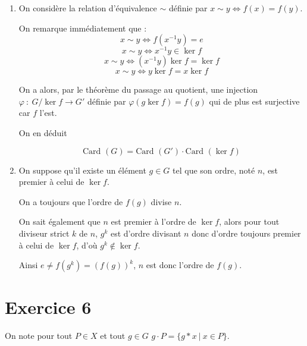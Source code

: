 \documentclass[]{article}
\theoremstyle{remark}
\theoremstyle{definition}
\newcommand{\funcshort}[3]{
#1 ~ : ~ #2 \longrightarrow #3
}
\begin{document}
\begin{enumerate}
	\item On considère la relation d'équivalence $\sim$ définie par $x \sim y \Longleftrightarrow f(x) = f(y)$.
	
	On remarque immédiatement que :
	$$x \sim y \Longleftrightarrow f(x^{-1}y) = e$$
	$$x \sim y \Longleftrightarrow x^{-1}y \in \ker f$$
	$$x \sim y \Longleftrightarrow \left(x^{-1}y\right)\ker f = \ker f$$
	$$x \sim y \Longleftrightarrow y \ker f = x \ker f$$

	On a alors, par le théorème du passage au quotient, une injection $\funcshort{\varphi}{G/\ker f}{G'}$ définie par $\varphi(g \ker f) = f(g)$ qui de plus est surjective car $f$ l'est.
	
	On en déduit
	
	$$\text{Card } (G) = \text{Card } (G') \cdot \text{Card } (\ker f)$$
	
	\item On suppose qu'il existe un élément $g \in G$ tel que son ordre, noté $n$, est premier à celui de $\ker f$.
	
	On a toujours que l'ordre de $f(g)$ divise $n$.
	
	On sait également que $n$ est premier à l'ordre de $\ker f$, alors pour tout diviseur strict $k$ de $n$, $g^k$ est d'ordre divisant $n$ donc d'ordre toujours premier à celui de $\ker f$, d'où $g^k \notin \ker f$.
	
	Ainsi $e \neq f(g^k) = \left(f(g)\right)^k$, $n$ est donc l'ordre de $f(g)$.
\end{enumerate}

\section*{Exercice 6}

On note pour tout $P \in X$ et tout $g \in G$ $g \cdot P = \{g * x ~ | ~ x \in P\}$.
\end{document}
